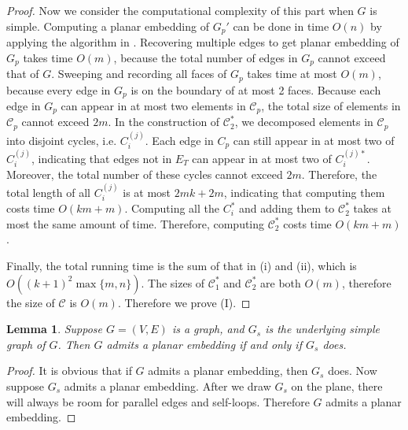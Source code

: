 \documentclass[10pt,fleqn]{article}
\newtheorem{lemma}[theorem]{Lemma}
\newcommand{\mc}[1]{\mathcal{#1}}
\begin{document}
\begin{proof}
		Now we consider the computational complexity of this part when $G$ is simple. Computing a planar embedding of $G_p'$ can be done in time $O(n)$ by applying the algorithm in \cite{109}. Recovering multiple edges to get planar embedding of $G_p$ takes time $O(m)$, because the total number of edges in $G_p$ cannot exceed that of $G$. Sweeping and recording all faces of $G_p$ takes time at most $O(m)$, because every edge in $G_p$ is on the boundary of at most 2 faces. Because each edge in $G_p$ can appear in at most two elements in $\mc{C}_p$, the total size of elements in $\mc{C}_p$ cannot exceed $2m$. In the construction of $\mc{C}_2^*$, we decomposed elements in $\mc{C}_p$ into disjoint cycles, i.e. $C_i^{(j)}$. Each edge in $C_p$ can still appear in at most two of $C_i^{(j)}$, indicating that edges not in $E_T$ can appear in at most two of $C_i^{(j)*}$. Moreover, the total number of these cycles cannot exceed $2m$. Therefore, the total length of all $C_i^{(j)}$ is at most $2mk+2m$, indicating that computing them costs time $O(km+m)$. Computing all the $C_i^*$ and adding them to $\mc{C}_2^*$ takes at most the same amount of time. Therefore, computing $\mc{C}_2^*$ costs time $O(km+m)$. \par
		Finally, the total running time is the sum of that in (i) and (ii), which is $O((k+1)^2\max\{m,n\})$. The sizes of $\mc{C}_1^*$ and $\mc{C}_2^*$ are both $O(m)$, therefore the size of $\mc{C}$ is $O(m)$. Therefore we prove (I).
	\end{proof}
	\begin{lemma}\label{lem62}
		Suppose $G=(V,E)$ is a graph, and $G_s$ is the underlying simple graph of $G$. Then $G$ admits a planar embedding if and only if $G_s$ does.
	\end{lemma}
	\begin{proof}
		It is obvious that if $G$ admits a planar embedding, then $G_s$ does. Now suppose $G_s$ admits a planar embedding. After we draw $G_s$ on the plane, there will always be room for parallel edges and self-loops. Therefore $G$ admits a planar embedding.
	\end{proof}
\end{document}
